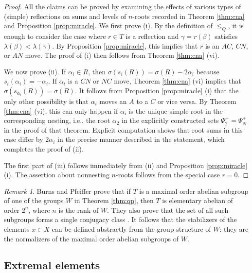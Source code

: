 \documentclass[11pt]{amsart}
\theoremstyle{plain}
\theoremstyle{definition}
\theoremstyle{remark}
\newtheorem{rmk}[theorem]{Remark}
\numberwithin{equation}{subsection}
\newcommand{\al}{\alpha}
\begin{document}
\begin{proof}
All the claims can be proved by examining the effects of various types of
(simple) reflections on sums and levels of $n$-roots recorded in Theorem
\ref{thm:cna} and Proposition \ref{prop:miracle}. We first prove (i). By the
definition of $\le_Q$, it is enough to consider the case where $r \in T$ is a
reflection and $\gamma = r(\beta)$ satisfies $\lambda(\beta)<\lambda(\gamma)$.
By Proposition \ref{prop:miracle}, this implies that  $r$ is an $AC$, $CN$, or
$AN$ move. The proof of (i) then follows from Theorem \ref{thm:cna} (vi).

We now prove (ii). If $\al_i \in R$, then $\sigma(s_i(R))=\sigma(R)-2\al_i$
because $s_{i}(\al_i) = -\al_i$. If $\al_i$ is a $CN$ or $NC$ move, Theorem
\ref{thm:cna} (vi) implies that $\sigma(s_{\al_i}(R)) = \sigma(R)$. It follows
from Proposition \ref{prop:miracle} (i) that the only other possibility is that
$\al_i$ moves an $A$ to a $C$ or vice versa. By Theorem \ref{thm:cna} (vi), this
can only happen if $\al_i$ is the unique simple root in the corresponding
nesting, i.e., the root $\al_2$ in the explicitly constructed sets
$\Psi_2^+=\Psi^+_N$ in the proof of that theorem. Explicit computation shows
that root sums in this case differ by $2\al_i$ in the precise manner described
in the statement, which completes the proof of (ii).

The first part of (iii) follows immediately from (ii) and Proposition
\ref{prop:miracle} (i).  The assertion about nonnesting $n$-roots follows from
the special case $r=0$.
\end{proof}

\begin{rmk}\label{rmk:burns}
Burns and Pfeiffer \cite[Theorem 1.2]{burns23} prove that if $T$ is a maximal
order abelian subgroup of one of the groups $W$ in Theorem \ref{thm:qp}, then
$T$ is elementary abelian of order $2^n$, where $n$ is the rank of $W$.  They
also prove that the set of all such subgroups forms a single conjugacy class
\cite[Theorem 3.1]{burns23}.  It follows that the stabilizers of the elements $x
\in X$ can be defined abstractly from the group structure of $W$: they are the
normalizers of the maximal order abelian subgroups of $W$.
\end{rmk}



\subsection{Extremal elements}
\label{sec:minmax}
\end{document}
